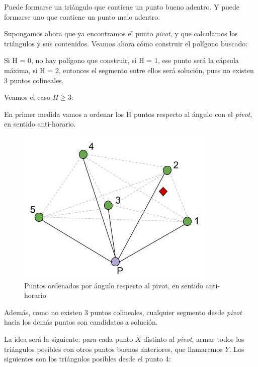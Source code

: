 Puede formarse un triángulo que contiene un punto bueno adentro. Y puede formarse uno que contiene un punto malo adentro.


Supongamos ahora que ya encontramos el punto \textit{pivot}, y que calculamos los triángulos y sus contenidos. Veamos ahora cómo construir el polígono buscado:

Si H = 0, no hay polígono que construir, si H = 1, ese punto será la cápsula máxima, si H = 2, entonces el segmento entre ellos será solución, pues no existen 3 puntos colineales.

Veamos el caso $H \geq 3$:

En primer medida vamos a ordenar los H puntos respecto al ángulo con el \textit{pivot}, en sentido anti-horario.

\begin{figure}[H]\centering\includegraphics[scale=0.7]{Imagenes/ej3/Imagen_D.jpg}\caption{Puntos ordenados por ángulo respecto al pivot, en sentido anti-horario}\end{figure}

Además, como no existen 3 puntos colineales, cualquier segmento desde \textit{pivot} hacia los demás puntos son candidatos a solución.

La idea será la siguiente: para cada punto $X$ distinto al \textit{pivot}, armar todos los triángulos posibles con otros puntos buenos anteriores, que llamaremos $Y$. Los siguientes son los triángulos posibles desde el punto 4:

